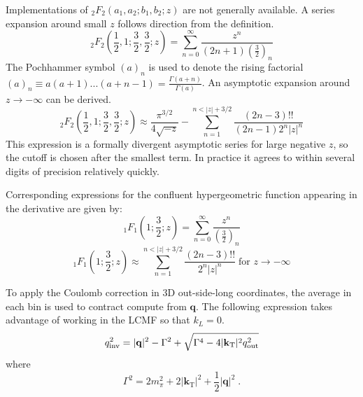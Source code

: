 Implementations of ${}_2F_2 (a_1, a_2; b_1, b_2; z)$ are not generally available.
A series expansion around small $z$ follows direction from the definition.
\begin{equation} {}_2F_2 \left( \frac{1}{2}, 1; \frac{3}{2}, \frac{3}{2}; z \right) = \sum_{n=0}^{\infty} \frac{z^n}{(2n+1) \left(\frac{3}{2}\right)_n} \end{equation}
The Pochhammer symbol $(a)_n$ is used to denote the rising factorial $(a)_n \equiv a(a+1)...(a+n-1) = \frac{\Gamma(a+n)}{\Gamma(a)}$.
An asymptotic expansion around $z \to - \infty$ can be derived.
\begin{equation} {}_2F_2 \left( \frac{1}{2}, 1; \frac{3}{2}, \frac{3}{2}; z \right) \approx \frac{\pi^{3/2}}{4\sqrt{-z}} - \sum_{n=1}^{n < |z| + 3/2} \frac{(2n-3)!!}{(2n-1) 2^n |z|^n}  \end{equation}
This expression is a formally divergent asymptotic series for large negative $z$, so the cutoff is chosen after the smallest term.
In practice it agrees to within several digits of precision relatively quickly.

Corresponding expressions for the confluent hypergeometric function appearing in the derivative are given by:
\begin{equation}
 {}_1F_1 \left( 1;\frac{3}{2}; z \right) = \sum_{n=0}^{\infty} \frac{z^n}{\left(\frac{3}{2}\right)_n} 
\end{equation}
\begin{equation}
  {}_1F_1 \left( 1; \frac{3}{2}; z \right) \approx \sum_{n=1}^{n < |z| + 3/2} \frac{(2n-3)!!}{2^n |z|^n} \; \textrm{for } z \rightarrow -\infty
\end{equation}

To apply the Coulomb correction in 3D out-side-long coordinates, the average \kt in each bin is used to contract compute \qinv from $\mathbf{q}$.
The following expression takes advantage of working in the \ac{LCMF} so that $k_L = 0$.
\begin{equation}
q_{\mathrm{inv}}^2 = |\mathbf{q}|^2 - \Gamma^2 + \sqrt{\Gamma^4 - 4 |\mathbf{k}_\mathrm{T}|^2 q_{\mathrm{out}}^2} \label{eqn:q3_to_qinv}
\end{equation}
where
\begin{equation}
\Gamma^2 = 2 m_{\pi}^2 + 2 |\mathbf{k}_\mathrm{T}|^2 + \frac{1}{2}|\mathbf{q}|^2 \; .
\end{equation}


